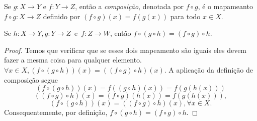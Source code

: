       \begin{definition}
         Se $g:X \to Y$ e $f:Y \to Z$, então a \emph{composição}, denotada por $f \circ g$, é o mapameanto $f \circ g: X \to Z$ definido por $(f \circ g)(x) = f(g(x))$ para todo $x \in X$.
      \end{definition}
      \begin{lemma}\label{comp-assoc}
      Se $h:X \to Y, g:Y \to Z$\ e\ $f:Z \to W$, então $f\circ (g\circ h) = (f \circ g)\circ h.$
      \begin{proof}
         Temos que verificar que se esses dois mapeamento são iguais eles devem fazer a mesma coisa para qualquer elemento.\\
         $\forall x \in X, (f\circ(g\circ h))(x) = ((f \circ g)\circ h)(x).$ A aplicação da definição de composição segue $$(f\circ (g\circ h))(x)=f((g\circ h)(x))=f(g(h(x)))$$ $$((f\circ g)\circ h)(x)=(f\circ g)(h(x))=f(g(h(x))),$$ $$(f\circ (g \circ h))(x)=((f \circ g)\circ h)(x), \forall x \in X.$$
         Consequentemente, por definição, $f \circ (g \circ h) = (f\circ g) \circ h.$
      \end{proof}
      \end{lemma}

